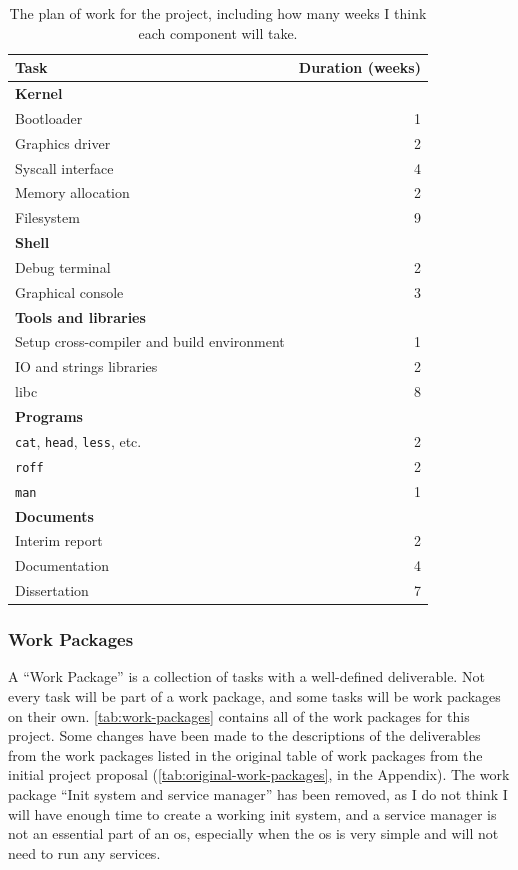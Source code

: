 \documentclass{article}
\begin{document}
\begin{table}[tbp]
\begin{center}
\begin{tabular}{|l|r|}
    \hline
    Task & Duration (weeks) \\
    \hline \textbf{Kernel} & \\
    Bootloader & 1 \\
    Graphics driver & 2 \\
    Syscall interface & 4 \\
    Memory allocation & 2 \\
    Filesystem & 9 \\
    \hline \textbf{Shell} & \\
    Debug terminal & 2 \\
    Graphical console & 3 \\
    \hline \textbf{Tools and libraries} & \\
    Setup cross-compiler and build environment & 1 \\
    IO and strings libraries & 2 \\
    libc & 8 \\
    \hline \textbf{Programs} & \\
    \texttt{cat}, \texttt{head}, \texttt{less}, etc. & 2 \\
    \texttt{roff} & 2 \\
    \texttt{man} & 1 \\
    \hline \textbf{Documents} & \\
    Interim report & 2 \\
    Documentation & 4 \\
    Dissertation & 7 \\
    \hline
\end{tabular}
\caption{The plan of work for the project, including how many weeks I think
each component will take.}
\label{tab:interim-work-plan}
\end{center}
\end{table}

\subsubsection{Work Packages}
\label{sec:work_packages}
A ``Work Package'' is a collection of tasks with a well-defined deliverable.
Not every task will be part of a work package, and some tasks will be work
packages on their own. \autoref{tab:work-packages} contains all of the work
packages for this project. Some changes have been made to the descriptions of
the deliverables from the work packages listed in the original table of work
packages from the initial project proposal
(\autoref{tab:original-work-packages}, in the Appendix). The work package
``Init system and service manager'' has been removed, as I do not think I will
have enough time to create a working init system, and a service manager is not
an essential part of an \gls{os}, especially when the \gls{os} is very simple
and will not need to run any services.
\end{document}
